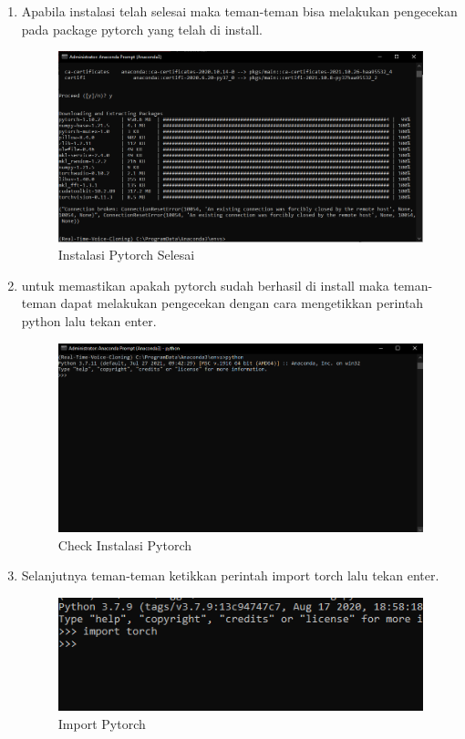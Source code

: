 \begin{enumerate}
\item Apabila instalasi telah selesai maka teman-teman bisa melakukan pengecekan pada package pytorch yang telah di install.
\begin{figure}[H]
\centering
\includegraphics[scale=.35]{figures/pytorch10}
\caption{Instalasi Pytorch Selesai}
\label{pytorch10}
\end{figure}

\item untuk memastikan apakah pytorch sudah berhasil di install maka teman-teman dapat melakukan pengecekan dengan cara mengetikkan perintah python lalu tekan enter.
\begin{figure}[H]
\centering
\includegraphics[scale=.35]{figures/pytorch11}
\caption{Check Instalasi Pytorch}
\label{pytorch11}
\end{figure}


\item Selanjutnya teman-teman ketikkan perintah import torch lalu tekan enter.
\begin{figure}[H]
\centering
\includegraphics[scale=.65]{figures/pytorch12}
\caption{Import Pytorch}
\label{pytorch12}
\end{figure}


\end{enumerate}
